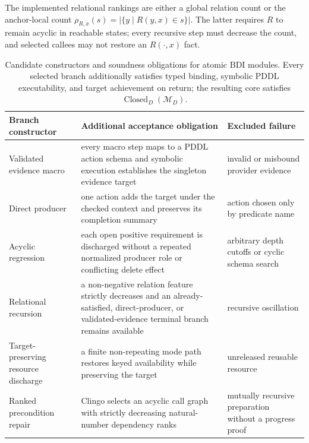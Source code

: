 The implemented relational rankings are either a global relation count or the
anchor-local count $\rho_{R,x}(s)=|\{y\mid R(y,x)\in s\}|$. The latter requires
$R$ to remain acyclic in reachable states; every recursive step must decrease
the count, and selected callees may not restore an $R(\cdot,x)$ fact.

\begin{table}[htbp]
\centering
\small
\setlength{\tabcolsep}{3.0pt}
\begin{tabular}{
>{\raggedright\arraybackslash}p{}
>{\raggedright\arraybackslash}p{}
>{\raggedright\arraybackslash}p{}}
\toprule
Branch constructor & Additional acceptance obligation & Excluded failure \\
\midrule
Validated evidence macro & every macro step maps to a PDDL action schema and
symbolic execution establishes the singleton evidence target & invalid or
misbound provider evidence \\
Direct producer & one action adds the target under the checked context and
preserves its completion summary & action chosen only by predicate name \\
Acyclic regression & each open positive requirement is discharged without a
repeated normalized producer role or conflicting delete effect & arbitrary
depth cutoffs or cyclic schema search \\
Relational recursion & a non-negative relation feature strictly decreases and
an already-satisfied, direct-producer, or validated-evidence terminal branch
remains available & recursive oscillation \\
Target-preserving resource discharge & a finite non-repeating mode path restores keyed
availability while preserving the target & unreleased reusable resource \\
Ranked precondition repair & Clingo selects an acyclic call graph with strictly
decreasing natural-number dependency ranks & mutually recursive preparation
without a progress proof \\
\bottomrule
\end{tabular}
\caption{Candidate constructors and soundness obligations for atomic BDI
modules. Every selected
branch additionally satisfies typed binding, symbolic PDDL executability, and
target achievement on return; the resulting core satisfies
$\operatorname{Closed}_D(\mathcal M_D)$.}
\label{tab:compiler-obligations}
\end{table}

